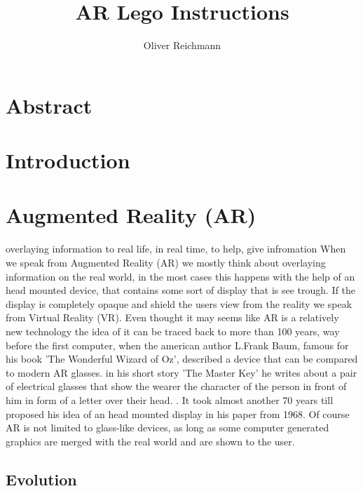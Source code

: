 \documentclass[11pt,a4paper]{article}
\author{Oliver Reichmann}
\title{AR Lego Instructions}
\begin{document}
	
\tableofcontents
\newpage
	
\section{Abstract}

\section{Introduction}

\section{Augmented Reality (AR)}

	overlaying information to real life, in real time, to help, give infromation
	When we speak from Augmented Reality (AR) we mostly think about overlaying information on the real world, in the most cases this happens with the help of an head mounted device, that contains some sort of display that is see trough. If the display is completely opaque and shield the users view from the reality we speak from Virtual Reality (VR). 
	Even thought it may seems like AR is a relatively new technology the idea of it can be traced back to more than 100 years, way before the first computer, when the american author L.Frank Baum, famous for his book 'The Wonderful Wizard of Oz', described a device that can be compared to modern AR glasses. in his short story 'The Master Key' he writes about a pair of electrical glasses that show the wearer the character of the person in front of him in form of a letter over their head. . It took almost another 70 years till  \cite{sutherland68} proposed his idea of an head mounted display in his paper from 1968. 
	Of course AR is not limited to glass-like devices, as long as some computer generated graphics are merged with the real world and are shown to the user. 
	
	\subsection{Evolution}
	
\end{document}
